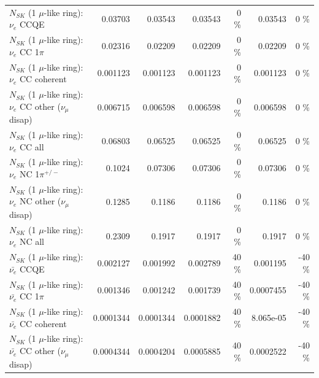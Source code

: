 \begin{table}
\begin{tabular}{| l | r | r | r  r | r  r |}
\hline
\hline
\hline
                                      $N_{SK}$ (1 $\mu$-like ring): $\nu_e$ CCQE &         0.03703 &         0.03543 &         0.03543 &        0 \%  &         0.03543 &        0 \%  \\ 
                                 $N_{SK}$ (1 $\mu$-like ring): $\nu_e$ CC 1$\pi$ &         0.02316 &         0.02209 &         0.02209 &        0 \%  &         0.02209 &        0 \%  \\ 
                               $N_{SK}$ (1 $\mu$-like ring): $\nu_e$ CC coherent &        0.001123 &        0.001123 &        0.001123 &        0 \%  &        0.001123 &        0 \%  \\ 
                $N_{SK}$ (1 $\mu$-like ring): $\nu_e$ CC other ($\nu_\mu$ disap) &        0.006715 &        0.006598 &        0.006598 &        0 \%  &        0.006598 &        0 \%  \\ 
                                  $N_{SK}$ (1 $\mu$-like ring): $\nu_{e}$ CC all &         0.06803 &         0.06525 &         0.06525 &        0 \%  &         0.06525 &        0 \%  \\ 
\hline
                           $N_{SK}$ (1 $\mu$-like ring): $\nu_e$ NC 1$\pi^{+/-}$ &          0.1024 &         0.07306 &         0.07306 &        0 \%  &         0.07306 &        0 \%  \\ 
                $N_{SK}$ (1 $\mu$-like ring): $\nu_e$ NC other ($\nu_\mu$ disap) &          0.1285 &          0.1186 &          0.1186 &        0 \%  &          0.1186 &        0 \%  \\ 
                                  $N_{SK}$ (1 $\mu$-like ring): $\nu_{e}$ NC all &          0.2309 &          0.1917 &          0.1917 &        0 \%  &          0.1917 &        0 \%  \\ 
\hline
\hline
\hline
                                $N_{SK}$ (1 $\mu$-like ring): $\bar{\nu_e}$ CCQE &        0.002127 &        0.001992 &        0.002789 &       40 \%  &        0.001195 &      -40 \%  \\ 
                           $N_{SK}$ (1 $\mu$-like ring): $\bar{\nu_e}$ CC 1$\pi$ &        0.001346 &        0.001242 &        0.001739 &       40 \%  &       0.0007455 &      -40 \%  \\ 
                         $N_{SK}$ (1 $\mu$-like ring): $\bar{\nu_e}$ CC coherent &       0.0001344 &       0.0001344 &       0.0001882 &       40 \%  &       8.065e-05 &      -40 \%  \\ 
          $N_{SK}$ (1 $\mu$-like ring): $\bar{\nu_e}$ CC other ($\nu_\mu$ disap) &       0.0004344 &       0.0004204 &       0.0005885 &       40 \%  &       0.0002522 &      -40 \%  \\ 

\end{tabular}
\end{table}
